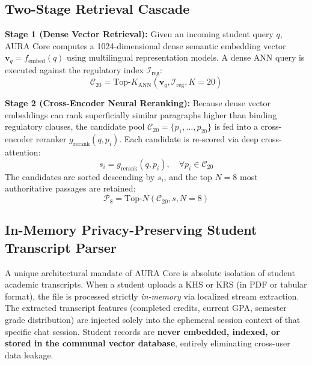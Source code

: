 \documentclass[conference]{IEEEtran}
\begin{document}
\subsection{Two-Stage Retrieval Cascade}
\textbf{Stage 1 (Dense Vector Retrieval):} Given an incoming student query $q$, AURA Core computes a 1024-dimensional dense semantic embedding vector $\mathbf{v}_q = f_{\text{embed}}(q)$ using multilingual representation models. A dense ANN query is executed against the regulatory index $\mathcal{I}_{\text{reg}}$:
\begin{equation}
\mathcal{C}_{20} = \text{Top-}K_{\text{ANN}}(\mathbf{v}_q, \mathcal{I}_{\text{reg}}, K=20)
\end{equation}

\textbf{Stage 2 (Cross-Encoder Neural Reranking):} Because dense vector embeddings can rank superficially similar paragraphs higher than binding regulatory clauses, the candidate pool $\mathcal{C}_{20} = \{p_1, \dots, p_{20}\}$ is fed into a cross-encoder reranker $g_{\text{rerank}}(q, p_i)$. Each candidate is re-scored via deep cross-attention:
\begin{equation}
s_i = g_{\text{rerank}}(q, p_i), \quad \forall p_i \in \mathcal{C}_{20}
\end{equation}
The candidates are sorted descending by $s_i$, and the top $N=8$ most authoritative passages are retained:
\begin{equation}
\mathcal{P}_8 = \text{Top-}N(\mathcal{C}_{20}, s, N=8)
\end{equation}

\subsection{In-Memory Privacy-Preserving Student Transcript Parser}
A unique architectural mandate of AURA Core is absolute isolation of student academic transcripts. When a student uploads a KHS or KRS (in PDF or tabular format), the file is processed strictly \textit{in-memory} via localized stream extraction. The extracted transcript features (completed credits, current GPA, semester grade distribution) are injected solely into the ephemeral session context of that specific chat session. Student records are \textbf{never embedded, indexed, or stored in the communal vector database}, entirely eliminating cross-user data leakage.
\end{document}
